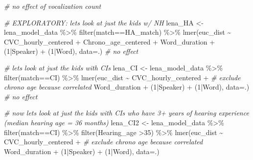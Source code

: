 \documentclass[
]{article}
\newenvironment{Shaded}{\begin{snugshade}}{\end{snugshade}}
\newcommand{\AttributeTok}[1]{\textcolor[rgb]{0.77,0.63,0.00}{#1}}
\newcommand{\CommentTok}[1]{\textcolor[rgb]{0.56,0.35,0.01}{\textit{#1}}}
\newcommand{\DecValTok}[1]{\textcolor[rgb]{0.00,0.00,0.81}{#1}}
\newcommand{\FunctionTok}[1]{\textcolor[rgb]{0.00,0.00,0.00}{#1}}
\newcommand{\NormalTok}[1]{#1}
\newcommand{\OtherTok}[1]{\textcolor[rgb]{0.56,0.35,0.01}{#1}}
\newcommand{\SpecialCharTok}[1]{\textcolor[rgb]{0.00,0.00,0.00}{#1}}
\newcommand{\StringTok}[1]{\textcolor[rgb]{0.31,0.60,0.02}{#1}}
\begin{document}
\begin{Shaded}
\begin{Highlighting}[]
\CommentTok{\# no effect of vocalization count}

\CommentTok{\# EXPLORATORY: let\textquotesingle{}s look at just the kids w/ NH}
\NormalTok{lena\_HA }\OtherTok{\textless{}{-}}\NormalTok{ lena\_model\_data }\SpecialCharTok{\%\textgreater{}\%}
  \FunctionTok{filter}\NormalTok{(match}\SpecialCharTok{==}\StringTok{\textquotesingle{}HA\_match\textquotesingle{}}\NormalTok{) }\SpecialCharTok{\%\textgreater{}\%}
  \FunctionTok{lmer}\NormalTok{(euc\_dist }\SpecialCharTok{\textasciitilde{}}\NormalTok{ CVC\_hourly\_centered }\SpecialCharTok{+} 
\NormalTok{         Chrono\_age\_centered }\SpecialCharTok{+} 
\NormalTok{         Word\_duration }\SpecialCharTok{+} 
\NormalTok{         (}\DecValTok{1}\SpecialCharTok{|}\NormalTok{Speaker) }\SpecialCharTok{+} 
\NormalTok{         (}\DecValTok{1}\SpecialCharTok{|}\NormalTok{Word), }
       \AttributeTok{data=}\NormalTok{.)  }\CommentTok{\# no effect }

\CommentTok{\# let\textquotesingle{}s look at just the kids with CIs}
\NormalTok{lena\_CI }\OtherTok{\textless{}{-}}\NormalTok{ lena\_model\_data }\SpecialCharTok{\%\textgreater{}\%} 
  \FunctionTok{filter}\NormalTok{(match}\SpecialCharTok{==}\StringTok{\textquotesingle{}CI\textquotesingle{}}\NormalTok{) }\SpecialCharTok{\%\textgreater{}\%}
  \FunctionTok{lmer}\NormalTok{(euc\_dist }\SpecialCharTok{\textasciitilde{}}\NormalTok{ CVC\_hourly\_centered }\SpecialCharTok{+} \CommentTok{\# exclude chrono age because correlated}
\NormalTok{         Word\_duration }\SpecialCharTok{+} 
\NormalTok{         (}\DecValTok{1}\SpecialCharTok{|}\NormalTok{Speaker) }\SpecialCharTok{+} 
\NormalTok{         (}\DecValTok{1}\SpecialCharTok{|}\NormalTok{Word), }
       \AttributeTok{data=}\NormalTok{.)  }\CommentTok{\# no effect}

\CommentTok{\# now let\textquotesingle{}s look at just the kids with CIs who have 3+ years of hearing experience (median hearing age = 36 months)}
\NormalTok{lena\_CI2 }\OtherTok{\textless{}{-}}\NormalTok{ lena\_model\_data }\SpecialCharTok{\%\textgreater{}\%} 
  \FunctionTok{filter}\NormalTok{(match}\SpecialCharTok{==}\StringTok{\textquotesingle{}CI\textquotesingle{}}\NormalTok{) }\SpecialCharTok{\%\textgreater{}\%}
  \FunctionTok{filter}\NormalTok{(Hearing\_age }\SpecialCharTok{\textgreater{}}\DecValTok{35}\NormalTok{) }\SpecialCharTok{\%\textgreater{}\%}
  \FunctionTok{lmer}\NormalTok{(euc\_dist }\SpecialCharTok{\textasciitilde{}}\NormalTok{ CVC\_hourly\_centered }\SpecialCharTok{+} \CommentTok{\# exclude chrono age because correlated}
\NormalTok{         Word\_duration }\SpecialCharTok{+} 
\NormalTok{         (}\DecValTok{1}\SpecialCharTok{|}\NormalTok{Speaker) }\SpecialCharTok{+} 
\NormalTok{         (}\DecValTok{1}\SpecialCharTok{|}\NormalTok{Word), }
       \AttributeTok{data=}\NormalTok{.) }


\end{Highlighting}
\end{Shaded}
\end{document}
